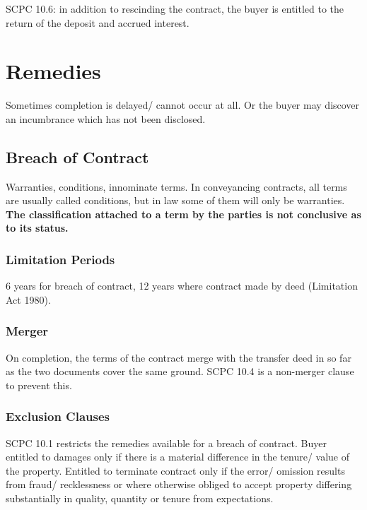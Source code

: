 \documentclass[
]{article}
\begin{document}
SCPC 10.6: in addition to rescinding the contract, the buyer is entitled
to the return of the deposit and accrued interest.

\hypertarget{remedies}{%
\section{Remedies}\label{remedies}}

Sometimes completion is delayed/ cannot occur at all. Or the buyer may
discover an incumbrance which has not been disclosed.

\hypertarget{breach-of-contract-1}{%
\subsection{Breach of Contract}\label{breach-of-contract-1}}

Warranties, conditions, innominate terms. In conveyancing contracts, all
terms are usually called conditions, but in law some of them will only
be warranties. \textbf{The classification attached to a term by the
parties is not conclusive as to its status.}

\hypertarget{limitation-periods}{%
\subsubsection{Limitation Periods}\label{limitation-periods}}

6 years for breach of contract, 12 years where contract made by deed
(Limitation Act 1980).

\hypertarget{merger}{%
\subsubsection{Merger}\label{merger}}

On completion, the terms of the contract merge with the transfer deed in
so far as the two documents cover the same ground. SCPC 10.4 is a
non-merger clause to prevent this.

\hypertarget{exclusion-clauses}{%
\subsubsection{Exclusion Clauses}\label{exclusion-clauses}}

SCPC 10.1 restricts the remedies available for a breach of contract.
Buyer entitled to damages only if there is a material difference in the
tenure/ value of the property. Entitled to terminate contract only if
the error/ omission results from fraud/ recklessness or where otherwise
obliged to accept property differing substantially in quality, quantity
or tenure from expectations.
\end{document}
